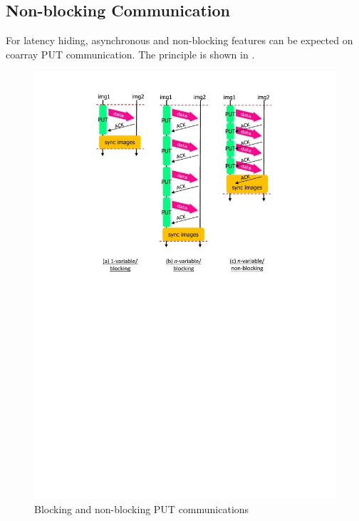 \subsection{Non-blocking Communication}

For latency hiding, asynchronous and non-blocking features can be expected 
on coarray PUT communication.
The principle is shown in .

\begin{figure}
  \begin{center}
    \mbox{\includegraphics[trim=43mm 144mm 43mm 3mm, scale=0.6,clip]{figs/nonblock-fig-r2.pdf}}
    \caption{Blocking and non-blocking PUT communications}\label{fig:nonblock-fig}
  \end{center}
\end{figure}


